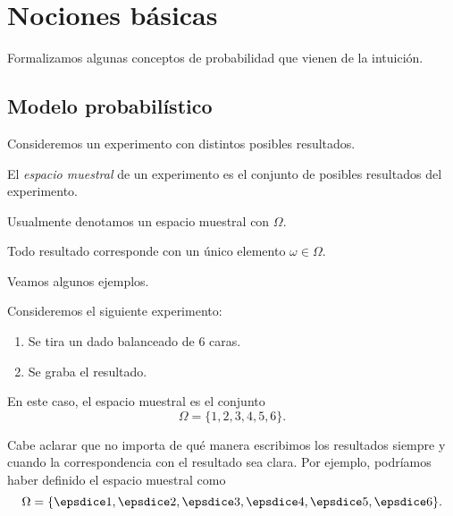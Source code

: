 \chapter{Nociones básicas}

Formalizamos algunas conceptos de probabilidad que vienen de la intuición. 


\section{Modelo probabilístico}

Consideremos un experimento con distintos posibles resultados. 

\begin{definition}
    El \emph{espacio muestral} de un experimento es el conjunto de posibles resultados del experimento. 
\end{definition}

Usualmente denotamos un espacio muestral con $\Omega$.

\begin{remark}
    Todo resultado corresponde con un único elemento $\omega \in \Omega$.
\end{remark}

Veamos algunos ejemplos.

\begin{example}
    \label{ex:dados}
    Consideremos el siguiente experimento:
    \begin{centeredvarwidth}
        \begin{enumerate}
            \item Se tira un dado balanceado de $6$ caras.
            \item Se graba el resultado.
        \end{enumerate}
    \end{centeredvarwidth}

    En este caso, el espacio muestral es el conjunto
    \begin{equation*}
        \Omega = \{ 1, 2, 3, 4, 5, 6 \}.
    \end{equation*}
\end{example}

Cabe aclarar que no importa de qué manera escribimos los resultados siempre y cuando la correspondencia con el resultado sea clara. Por ejemplo, podríamos haber definido el espacio muestral como
\begin{equation*}
    \Omega = \{ \vcdice{1}, \vcdice{2}, \vcdice{3}, \vcdice{4}, \vcdice{5}, \vcdice{6}\}.
\end{equation*}


